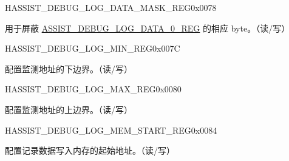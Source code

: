 \begin{register}{H}{ASSIST\_DEBUG\_LOG\_DATA\_MASK\_REG}{0x0078}\label{regdesc:ASSISTDEBUGLOGDATAMASKREG}
%
%
\regnewline%
\begin{regdesc}\begin{reglist}
\label{fielddesc:ASSISTDEBUGLOGDATASIZE}\item [ASSIST\_DEBUG\_LOG\_DATA\_SIZE] 用于屏蔽 \hyperref[regdesc:ASSISTDEBUGLOGDATA0REG]{ASSIST\_DEBUG\_LOG\_DATA\_0\_REG} 的相应 byte。（读/写）
\end{reglist}\end{regdesc}
\end{register}


\begin{register}{H}{ASSIST\_DEBUG\_LOG\_MIN\_REG}{0x007C}\label{regdesc:ASSISTDEBUGLOGMINREG}
%
\regnewline%
\begin{regdesc}\begin{reglist}
\label{fielddesc:ASSISTDEBUGLOGMIN}\item [ASSIST\_DEBUG\_LOG\_MIN] 配置监测地址的下边界。（读/写）
\end{reglist}\end{regdesc}
\end{register}


\begin{register}{H}{ASSIST\_DEBUG\_LOG\_MAX\_REG}{0x0080}\label{regdesc:ASSISTDEBUGLOGMAXREG}
%
\regnewline%
\begin{regdesc}\begin{reglist}
\label{fielddesc:ASSISTDEBUGLOGMAX}\item [ASSIST\_DEBUG\_LOG\_MAX] 配置监测地址的上边界。（读/写）
\end{reglist}\end{regdesc}
\end{register}


\begin{register}{H}{ASSIST\_DEBUG\_LOG\_MEM\_START\_REG}{0x0084}\label{regdesc:ASSISTDEBUGLOGMEMSTARTREG}
%
\regnewline%
\begin{regdesc}\begin{reglist}
\label{fielddesc:ASSISTDEBUGLOGMEMSTART}\item [ASSIST\_DEBUG\_LOG\_MEM\_START] 配置记录数据写入内存的起始地址。（读/写）
\end{reglist}\end{regdesc}
\end{register}


